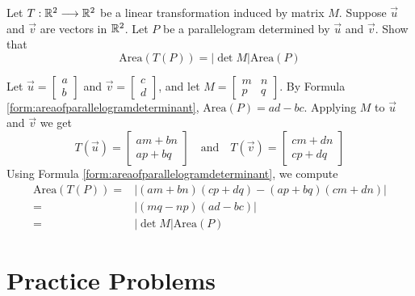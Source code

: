 \documentclass{ximera}
\begin{document}
    \begin{example}\label{ex:detLinTransArea}
        Let $T:\mathbb{R}^2\longrightarrow\mathbb{R}^2$ be a linear transformation induced by matrix $M$.  Suppose $\vec{u}$ and $\vec{v}$ are vectors in $\mathbb{R}^2$.  Let $P$ be a parallelogram determined by $\vec{u}$ and $\vec{v}$.  Show that
        $$\mbox{Area}(T(P))=\left|\det{M}\right|\mbox{Area}(P)$$
        \begin{explanation}
            Let $\vec{u}=\begin{bmatrix}a\\b\end{bmatrix}$ and $\vec{v}=\begin{bmatrix}c\\d\end{bmatrix}$, and let $M=\begin{bmatrix}m & n\\p & q\end{bmatrix}$.  By Formula \ref{form:areaofparallelogramdeterminant}, $\mbox{Area}(P)=ad-bc$.  Applying $M$ to $\vec{u}$ and $\vec{v}$ we get
            $$T(\vec{u})=\begin{bmatrix}am+bn\\ap+bq\end{bmatrix}\quad\mbox{and}\quad T(\vec{v})=\begin{bmatrix}cm+dn\\cp+dq\end{bmatrix}$$
            Using Formula \ref{form:areaofparallelogramdeterminant}, we compute
            \begin{align*}
            \mbox{Area}(T(P))=&|(am+bn)(cp+dq)-(ap+bq)(cm+dn)|\\
            =&|(mq-np)(ad-bc)|\\
            =&|\det{M}|\mbox{Area}(P)
            \end{align*}
        \end{explanation}
    \end{example}
     
    \section*{Practice Problems}
     
\end{document}
